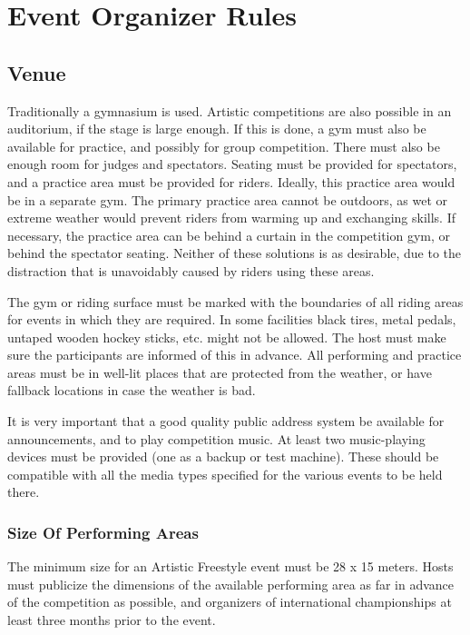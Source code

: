 \chapter{Event Organizer Rules}

\section{Venue}

Traditionally a gymnasium is used.
Artistic competitions are also possible in an auditorium, if the stage is large enough.
If this is done, a gym must also be available for practice, and possibly for group competition.
There must also be enough room for judges and spectators.
Seating must be provided for spectators, and a practice area must be provided for riders.
Ideally, this practice area would be in a separate gym.
The primary practice area cannot be outdoors, as wet or extreme weather would prevent riders from warming up and exchanging skills.
If necessary, the practice area can be behind a curtain in the competition gym, or behind the spectator seating.
Neither of these solutions is as desirable, due to the distraction that is unavoidably caused by riders using these areas.

The gym or riding surface must be marked with the boundaries of all riding areas for events in which they are required.
In some facilities black tires, metal pedals, untaped wooden hockey sticks, etc.
might not be allowed.
The host must make sure the participants are informed of this in advance.
All performing and practice areas must be in well-lit places that are protected from the weather, or have fallback locations in case the weather is bad.

It is very important that a good quality public address system be available for announcements, and to play competition music.
At least two music-playing devices must be provided (one as a backup or test machine).
These should be compatible with all the media types specified for the various events to be held there.

\subsection{Size Of Performing Areas}
The minimum size for an Artistic Freestyle event must be 28 x 15 meters.
Hosts must publicize the dimensions of the available performing area as far in advance of the competition as possible, and organizers of international championships at least three months prior to the event.

